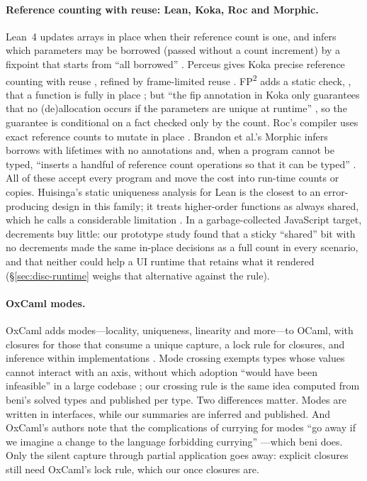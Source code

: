 \paragraph{Reference counting with reuse: Lean, Koka, Roc and Morphic.} Lean~4 updates arrays in place
when their reference count is one, and infers which parameters may be borrowed (passed without a count
increment) by a fixpoint that starts from ``all borrowed'' \citep{ullrich2019beans,demoura2021lean4}.
Perceus gives Koka precise reference counting with reuse \citep{reinking2021perceus}, refined by
frame-limited reuse \citep{lorenzen2022frame}. FP\textsuperscript{2} adds a static check, , that
a function is fully in place \citep{lorenzen2023fp2}; but ``the fip annotation in Koka only guarantees that
no (de)allocation occurs if the parameters are unique at runtime'' \citep[\S3.1]{lorenzen2024bst}, so the
guarantee is conditional on a fact checked only by the count. Roc's compiler uses exact reference counts
to mutate in place \citep{teeuwissen2023roc}. Brandon et al.'s Morphic infers borrows with lifetimes with no
annotations and, when a program cannot be typed, ``inserts a handful of reference count operations so that
it can be typed'' \citep{brandon2026borrows}. All of these accept every program and move the cost into
run-time counts or copies. Huisinga's static uniqueness analysis for Lean is the closest to an
error-producing design in this family; it treats higher-order functions as always shared, which he calls a
considerable limitation \citep[\S4.1]{huisinga2023lean}. In a garbage-collected JavaScript target, decrements
buy little: our prototype study found that a sticky ``shared'' bit with no decrements made the same in-place
decisions as a full count in every scenario, and that neither could help a UI runtime that retains what it
rendered (\S\ref{sec:disc-runtime} weighs that alternative against the rule).

\paragraph{OxCaml modes.} OxCaml adds modes---locality, uniqueness, linearity and more---to OCaml, with
 closures for those that consume a unique capture, a lock rule for closures, and inference within
implementations \citep{lorenzen2024oxidizing,oxcaml2025uniqueness}. Mode crossing exempts types whose values
cannot interact with an axis, without which adoption ``would have been infeasible'' in a large codebase
\citep[\S1]{peters2026mode}; our crossing rule is the same idea computed from beni's solved types and
published per type. Two differences matter. Modes are written in interfaces, while our summaries are
inferred and published. And OxCaml's authors note that the complications of currying for modes ``go away if
we imagine a change to the language forbidding currying'' \citep[\S6.4]{lorenzen2024oxidizing}---which
beni does. Only the silent capture through partial application goes away: explicit closures still need
OxCaml's lock rule, which our once closures are.

